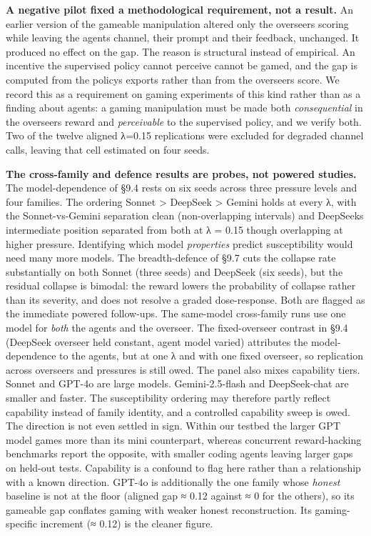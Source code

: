 \documentclass[11pt]{article}
\begin{document}
\textbf{A negative pilot fixed a methodological requirement, not a
result.} An earlier version of the gameable manipulation altered only
the overseer\textquotesingle s scoring while leaving the
agents\textquotesingle{} channel, their prompt and their feedback,
unchanged. It produced no effect on the gap. The reason is structural
instead of empirical. An incentive the supervised policy cannot perceive
cannot be gamed, and the gap is computed from the
policy\textquotesingle s exports rather than from the
overseer\textquotesingle s score. We record this as a requirement on
gaming experiments of this kind rather than as a finding about agents: a
gaming manipulation must be made both \emph{consequential} in the
overseer\textquotesingle s reward and \emph{perceivable} to the
supervised policy, and we verify both. Two of the twelve aligned λ=0.15
replications were excluded for degraded channel calls, leaving that cell
estimated on four seeds.

\textbf{The cross-family and defence results are probes, not powered
studies.} The model-dependence of §9.4 rests on six seeds across three
pressure levels and four families. The ordering Sonnet \textgreater{}
DeepSeek \textgreater{} Gemini holds at every λ, with the
Sonnet-vs-Gemini separation clean (non-overlapping intervals) and
DeepSeek\textquotesingle s intermediate position separated from both at
λ = 0.15 though overlapping at higher pressure. Identifying which model
\emph{properties} predict susceptibility would need many more models.
The breadth-defence of §9.7 cuts the collapse rate substantially on both
Sonnet (three seeds) and DeepSeek (six seeds), but the residual collapse
is bimodal: the reward lowers the probability of collapse rather than
its severity, and does not resolve a graded dose-response. Both are
flagged as the immediate powered follow-ups. The same-model cross-family
runs use one model for \emph{both} the agents and the overseer. The
fixed-overseer contrast in §9.4 (DeepSeek overseer held constant, agent
model varied) attributes the model-dependence to the agents, but at one
λ and with one fixed overseer, so replication across overseers and
pressures is still owed. The panel also mixes capability tiers. Sonnet
and GPT-4o are large models. Gemini-2.5-flash and DeepSeek-chat are
smaller and faster. The susceptibility ordering may therefore partly
reflect capability instead of family identity, and a controlled
capability sweep is owed. The direction is not even settled in sign.
Within our testbed the larger GPT model games more than its mini
counterpart, whereas concurrent reward-hacking benchmarks report the
opposite, with smaller coding agents leaving larger gaps on held-out
tests. Capability is a confound to flag here rather than a relationship
with a known direction. GPT-4o is additionally the one family whose
\emph{honest} baseline is not at the floor (aligned gap ≈ 0.12 against ≈
0 for the others), so its gameable gap conflates gaming with weaker
honest reconstruction. Its gaming-specific increment (≈ 0.12) is the
cleaner figure.
\end{document}
